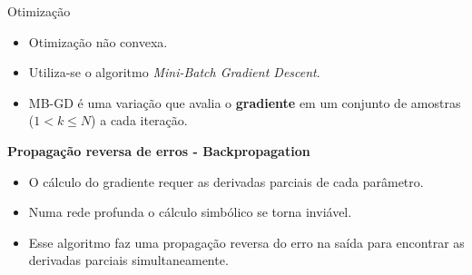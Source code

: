 \begin{frame}{Otimização}
	\begin{itemize}
		\item Otimização não convexa.
		\item Utiliza-se o algoritmo \emph{Mini-Batch Gradient Descent}.
		\item MB-GD é uma variação que avalia o \textbf{gradiente} em um conjunto de amostras ($1 < k \leq N$) a cada iteração.
	\end{itemize}

	\pause

	\textbf{Propagação reversa de erros - Backpropagation} \\
	\begin{itemize}
		\item O cálculo do gradiente requer as derivadas parciais de cada parâmetro.
		\item Numa rede profunda o cálculo simbólico se torna inviável.
		\item Esse algoritmo faz uma propagação reversa do erro na saída para encontrar as derivadas parciais simultaneamente.
	\end{itemize}
\end{frame}
